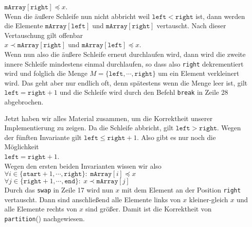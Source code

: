 \begin{enumerate}
      \hspace*{1.3cm} $\mathtt{mArray}[\mathtt{right}] \preceq x$. \\[0.1cm]
      Wenn die \"au{\ss}ere Schleife nun nicht abbricht weil $\texttt{left} < \mathtt{right}$ ist,
      dann werden die Elemente $\mathtt{mArray}[\mathtt{left}]$ und
      $\mathtt{mArray}[\mathtt{right}]$ vertauscht.  Nach dieser Vertauschung gilt 
      offenbar \\[0.1cm]
      \hspace*{1.3cm} 
      $x \prec \mathtt{mArray}[\mathtt{right}]$ \quad und \quad $\mathtt{mArray}[\mathtt{left}] \preceq x$. 
      \\[0.1cm]
      Wenn nun also die \"au{\ss}ere Schleife erneut durchlaufen wird, dann wird die zweite
      innere Schleife mindestens einmal durchlaufen, so dass also \texttt{right}
      dekrementiert wird und folglich die Menge $M = \{ \mathtt{left}, \cdots, \mathtt{right} \}$ 
      um ein Element verkleinert wird.  Das geht aber nur endlich oft, denn sp\"atestens
      wenn die Menge leer ist, gilt $\mathtt{left} = \mathtt{right} + 1$
      und die Schleife wird durch den Befehl \texttt{break} in Zeile 28 abgebrochen. 
\end{enumerate}
Jetzt haben wir alles Material zusammen, um die Korrektheit unserer Implementierung zu zeigen.
Da die Schleife abbricht, gilt $\mathtt{left} > \mathtt{right}$.  Wegen der f\"unften
Invariante gilt $\texttt{left} \leq \mathtt{right} + 1$.  Also gibt es nur noch die
M\"oglichkeit
\\[0.2cm]
\hspace*{1.3cm}
$\texttt{left} = \mathtt{right} +
1$.
\\[0.2cm]  
Wegen den ersten beiden Invarianten
wissen wir also \\[0.1cm]
\hspace*{1.3cm} 
 $\forall i \in \{ \mathtt{start}+1, \cdots, \mathtt{right} \} \colon\; \mathtt{mArray}[i] \preceq x$ \\[0.1cm]
\hspace*{1.3cm} 
 $\forall j \in \{ \mathtt{right}+1, \cdots, \mathtt{end} \} \colon\; x \prec \mathtt{mArray}[j]$
\\[0.1cm]
Durch das \texttt{swap} in Zeile 17 wird nun $x$ mit dem Element an der Position
\texttt{right} vertauscht.  Dann sind anschlie{\ss}end alle Elemente links von $x$
kleiner-gleich $x$ und alle Elemente rechts von $x$ sind gr\"o{\ss}er.
Damit ist die Korrektheit von \texttt{partition}() nachgewiesen.

